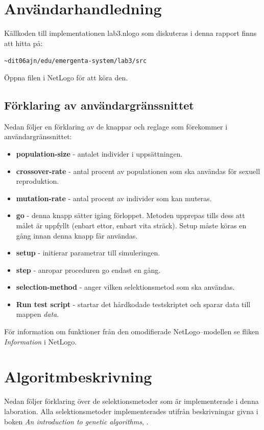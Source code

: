 \documentclass[titlepage, a4paper, 12pt]{article}
\begin{document}
\section{Användarhandledning}
Källkoden till implementationen lab3.nlogo som diskuteras i denna
rapport finns att hitta på:

\verb!~dit06ajn/edu/emergenta-system/lab3/src!

Öppna filen i NetLogo för att köra den.

\subsection{Förklaring av användargränssnittet}
Nedan följer en förklaring av de knappar och reglage som förekommer i
användargränssnittet:

\begin{itemize}
\item \textbf{population-size} - antalet individer i uppsättningen.
\item \textbf{crossover-rate} - antal procent av populationen som ska användas för sexuell reproduktion.
\item \textbf{mutation-rate} - antal procent av individer som kan muteras.
\item \textbf{go} - denna knapp sätter igång förloppet. Metoden upprepas tills dess att målet är uppfyllt (enbart ettor, enbart vita sträck). Setup måste köras en gång innan denna knapp får användas.
\item \textbf{setup} - initierar parametrar till simuleringen.
\item \textbf{step} - anropar proceduren go endast en gång.
\item \textbf{selection-method} - anger vilken selektionsmetod som ska användas.
\item \textbf{Run test script} - startar det hårdkodade testskriptet
  och sparar data till mappen \textit{data}.
\end{itemize}

För information om funktioner från den omodifierade NetLogo–modellen
se fliken \textit{Information} i NetLogo.

\section{Algoritmbeskrivning}
Nedan följer förklaring över de selektionsmetoder som är
implementerade i denna laboration. Alla selektionsmetoder
implementerades utifrån beskrivningar givna i boken \textit{An
  introduction to genetic algorithms}, \cite{gen-intro}.
\end{document}
